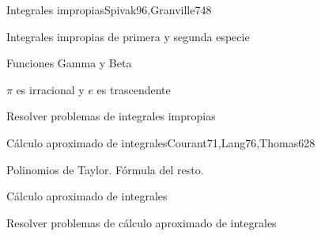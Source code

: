 \begin{syllabus}
\begin{unit}{Integrales impropias}{Spivak96,Granville74}{8}
\begin{topics}
	\item Integrales impropias de primera y segunda especie
	\item Funciones Gamma y Beta
	\item $\pi$ es irracional y $e$ es trascendente
\end{topics}

\begin{unitgoals}
	\item Resolver problemas de integrales impropias
\end{unitgoals}
\end{unit}

\begin{unit}{Cálculo aproximado de integrales}{Courant71,Lang76,Thomas62}{8}
\begin{topics}
      \item Polinomios de Taylor. Fórmula del resto.
      \item Cálculo aproximado de integrales
  \end{topics}

   \begin{unitgoals}
      \item Resolver problemas de cálculo aproximado de integrales
   \end{unitgoals}
\end{unit}

\begin{coursebibliography}
\end{coursebibliography}
\end{syllabus}
